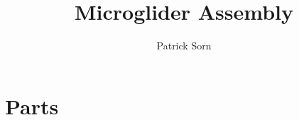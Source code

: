 \documentclass[hidelinks, 11pt, fleqn]{article}   	%
\title{\textbf{Microglider Assembly}}
\author{Patrick Sorn}
\begin{document}
\newcommand{\hole}[3] %
{ 
	\draw (#1,#2) circle (#3mm);
	\draw (#1,#2-0.05) -- (#1,#2+0.05);
	\draw (#1-0.05,#2) -- (#1+0.05,#2);
	\draw (#1,#2-0.1*#3-0.05) -- (#1,#2-0.1);
	\draw (#1,#2+0.1) -- (#1,#2+0.1*#3+0.05);
	\draw (#1-0.1*#3-0.05,#2) -- (#1-0.1,#2);
	\draw (#1+0.1,#2) -- (#1+0.1*#3+0.05,#2);
}
\newcommand{\dimsv}[3] %
{
	\draw (#3-0.2,#1) -- (#3+0.2,#1);
	\draw[<-] (#3,#1) -- (#3,{(#1+#2)/2-0.2});
	\draw (#3,{(#1+#2)/2}) node {\footnotesize \pgfmathparse{(#2 - #1)*10} \pgfmathprintnumber{\pgfmathresult} };
	\draw[->] (#3,{(#1+#2)/2+0.2}) -- (#3,#2);
	\draw (#3-0.2,#2) -- (#3+0.2,#2);
}
\newcommand{\dimsh}[3] %
{
	\draw (#1,#3-0.1) -- (#1,#3+0.1);
	\draw[<-] (#1,#3) -- ({(#1+#2)/2-0.3},#3);
	\draw ({(#1+#2)/2},#3) node {\footnotesize \pgfmathparse{(#2 - #1)*10} \pgfmathprintnumber{\pgfmathresult} };
	\draw[->] ({(#1+#2)/2+0.3},#3) -- (#2,#3);
	\draw (#2,#3-0.1) -- (#2,#3+0.1);
}
\maketitle
\tableofcontents 
\pagebreak
\section{Parts}
\end{document}
